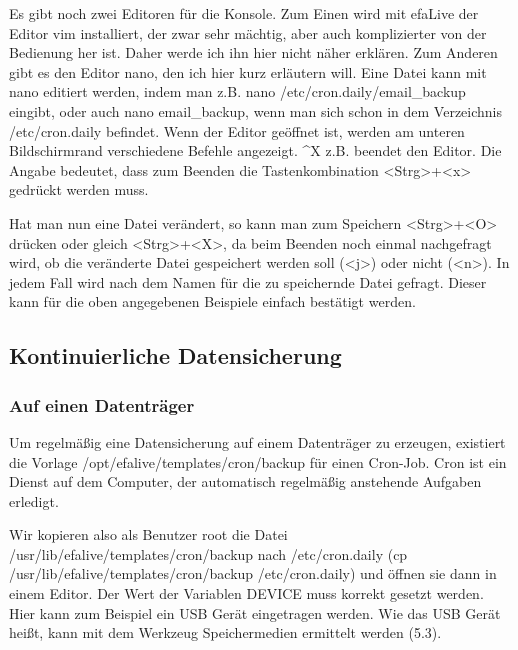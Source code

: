 \documentclass[a4paper,12pt,twoside]{article}
\begin{document}
Es gibt noch zwei Editoren für die Konsole. Zum Einen wird mit efaLive
der Editor {\textquotedbl}vim{\textquotedbl} installiert, der zwar sehr
mächtig, aber auch komplizierter von der Bedienung her ist. Daher werde
ich ihn hier nicht näher erklären. Zum Anderen gibt es den Editor
{\textquotedbl}nano{\textquotedbl}, den ich hier kurz erläutern will.
Eine Datei kann mit nano editiert werden, indem man z.B.
{\textquotedbl}nano /etc/cron.daily/email\_backup{\textquotedbl}
eingibt, oder auch {\textquotedbl}nano email\_backup{\textquotedbl},
wenn man sich schon in dem Verzeichnis /etc/cron.daily befindet. Wenn
der Editor geöffnet ist, werden am unteren Bildschirmrand verschiedene
Befehle angezeigt. {\textquotedbl}\^{}X{\textquotedbl} z.B. beendet den
Editor. Die Angabe bedeutet, dass zum Beenden die Tastenkombination
{\textless}Strg{\textgreater}+{\textless}x{\textgreater} gedrückt
werden muss.

Hat man nun eine Datei verändert, so kann man zum Speichern
{\textless}Strg{\textgreater}+{\textless}O{\textgreater} drücken oder
gleich {\textless}Strg{\textgreater}+{\textless}X{\textgreater}, da
beim Beenden noch einmal nachgefragt wird, ob die veränderte Datei
gespeichert werden soll ({\textless}j{\textgreater}) oder nicht
({\textless}n{\textgreater}). In jedem Fall wird nach dem Namen für die
zu speichernde Datei gefragt. Dieser kann für die oben angegebenen
Beispiele einfach bestätigt werden.


\bigskip

\subsection{Kontinuierliche Datensicherung}
\subsubsection[Auf einen Datenträger]{Auf einen Datenträger}
\label{bkm:RefHeading1707162567456}Um regelmäßig eine Datensicherung auf
einem Datenträger zu erzeugen, existiert die Vorlage
/opt/efalive/templates/cron/backup für einen Cron-Job. Cron ist ein
Dienst auf dem Computer, der automatisch regelmäßig anstehende Aufgaben
erledigt.

Wir kopieren also als Benutzer {\textquotedbl}root{\textquotedbl} die
Datei /usr/lib/efalive/templates/cron/backup nach /etc/cron.daily (cp
/usr/lib/efalive/templates/cron/backup /etc/cron.daily) und öffnen sie
dann in einem Editor. Der Wert der Variablen DEVICE muss korrekt
gesetzt werden. Hier kann zum Beispiel ein USB Gerät eingetragen
werden. Wie das USB Gerät heißt, kann mit dem Werkzeug Speichermedien
ermittelt werden (5.3).
\end{document}
